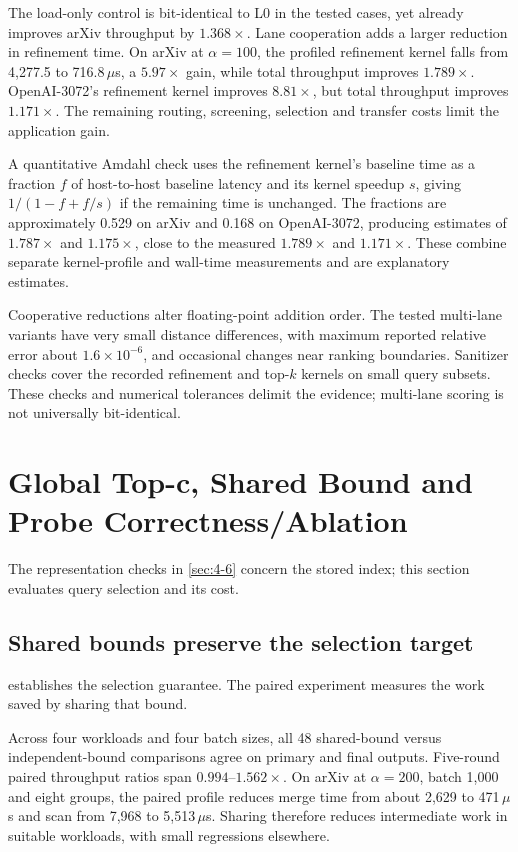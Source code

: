 The load-only control is bit-identical to L0 in the tested cases, yet
already improves arXiv throughput by $1.368\times$. Lane cooperation adds
a larger reduction in refinement time. On arXiv at $\alpha=100$, the
profiled refinement kernel falls from 4,277.5 to 716.8\,$\mu$s, a
$5.97\times$ gain, while total throughput improves $1.789\times$.
OpenAI-3072's refinement kernel improves $8.81\times$, but total throughput
improves $1.171\times$. The remaining routing, screening, selection and
transfer costs limit the application gain.

A quantitative Amdahl check uses the refinement kernel's baseline time
as a fraction $f$ of host-to-host baseline latency and its kernel speedup
$s$, giving $1/(1-f+f/s)$ if the remaining time is unchanged. The fractions
are approximately 0.529 on arXiv and 0.168 on OpenAI-3072, producing
estimates of $1.787\times$ and $1.175\times$, close to the measured
$1.789\times$ and $1.171\times$. These combine separate kernel-profile
and wall-time measurements and are explanatory estimates.

Cooperative reductions alter floating-point addition order. The tested
multi-lane variants have very small distance differences, with maximum
reported relative error about $1.6\times10^{-6}$, and occasional changes
near ranking boundaries. Sanitizer checks cover the recorded refinement
and top-$k$ kernels on small query subsets. These checks and numerical
tolerances delimit the evidence; multi-lane scoring is not universally
bit-identical.

\section{Global Top-c, Shared Bound and Probe Correctness/Ablation}
\label{sec:7-4}

The representation checks in \cref{sec:4-6} concern the stored index;
this section evaluates query selection and its cost.




\subsection{Shared bounds preserve the selection target}

 establishes the selection guarantee. The
paired experiment measures the work saved by sharing that bound.


Across four workloads and four batch sizes, all 48 shared-bound versus
independent-bound comparisons agree on primary and final outputs.
Five-round paired throughput ratios span $0.994$--$1.562\times$.
On arXiv at $\alpha=200$, batch 1,000 and eight groups, the paired
profile reduces merge time from about 2,629 to 471\,$\mu$s and scan
from 7,968 to 5,513\,$\mu$s. Sharing therefore reduces intermediate work
in suitable workloads, with small regressions elsewhere.

